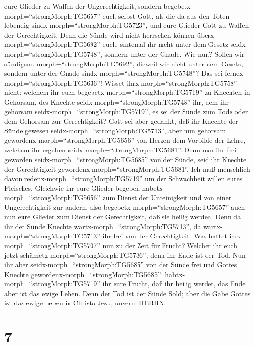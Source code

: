 eure Glieder zu Waffen der Ungerechtigkeit, sondern
begebetx-morph=``strongMorph:TG5657'' euch selbst Gott, als die da aus
den Toten lebendig sindx-morph=``strongMorph:TG5723'', und eure Glieder
Gott zu Waffen der Gerechtigkeit.  Denn die Sünde wird
nicht herrschen können überx-morph=``strongMorph:TG5692'' euch, sintemal
ihr nicht unter dem Gesetz seidx-morph=``strongMorph:TG5748'', sondern
unter der Gnade.  Wie nun? Sollen wir
sündigenx-morph=``strongMorph:TG5692'', dieweil wir nicht unter dem
Gesetz, sondern unter der Gnade sindx-morph=``strongMorph:TG5748''? Das
sei fernex-morph=``strongMorph:TG5636''!  Wisset
ihrx-morph=``strongMorph:TG5758'' nicht: welchem ihr euch
begebetx-morph=``strongMorph:TG5719'' zu Knechten in Gehorsam, des
Knechte seidx-morph=``strongMorph:TG5748'' ihr, dem ihr gehorsam
seidx-morph=``strongMorph:TG5719'', es sei der Sünde zum Tode oder dem
Gehorsam zur Gerechtigkeit?  Gott sei aber gedankt, daß ihr
Knechte der Sünde gewesen seidx-morph=``strongMorph:TG5713'', aber nun
gehorsam gewordenx-morph=``strongMorph:TG5656'' von Herzen dem Vorbilde
der Lehre, welchem ihr ergeben seidx-morph=``strongMorph:TG5681''.
 Denn nun ihr frei geworden
seidx-morph=``strongMorph:TG5685'' von der Sünde, seid ihr Knechte der
Gerechtigkeit gewordenx-morph=``strongMorph:TG5681''.  Ich
muß menschlich davon redenx-morph=``strongMorph:TG5719'' um der
Schwachheit willen eures Fleisches. Gleichwie ihr eure Glieder begeben
habetx-morph=``strongMorph:TG5656'' zum Dienst der Unreinigkeit und von
einer Ungerechtigkeit zur andern, also
begebetx-morph=``strongMorph:TG5657'' auch nun eure Glieder zum Dienst
der Gerechtigkeit, daß sie heilig werden.  Denn da ihr der
Sünde Knechte wartx-morph=``strongMorph:TG5713'', da
wartx-morph=``strongMorph:TG5713'' ihr frei von der Gerechtigkeit.
 Was hattet ihrx-morph=``strongMorph:TG5707'' nun zu der
Zeit für Frucht? Welcher ihr euch jetzt
schämetx-morph=``strongMorph:TG5736''; denn ihr Ende ist der Tod.
 Nun ihr aber seidx-morph=``strongMorph:TG5685'' von der
Sünde frei und Gottes Knechte gewordenx-morph=``strongMorph:TG5685'',
habtx-morph=``strongMorph:TG5719'' ihr eure Frucht, daß ihr heilig
werdet, das Ende aber ist das ewige Leben.  Denn der Tod
ist der Sünde Sold; aber die Gabe Gottes ist das ewige Leben in Christo
Jesu, unserm HERRN.

\hypertarget{section-6}{%
\section{7}\label{section-6}}

